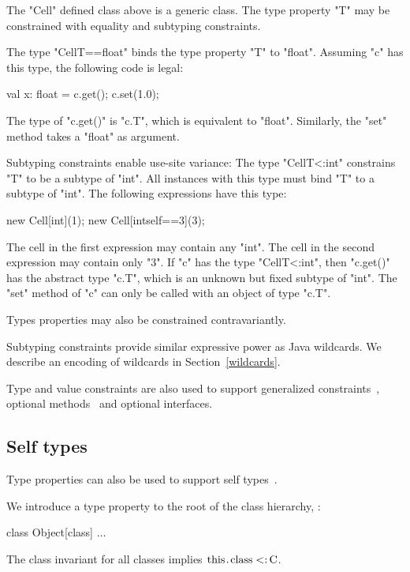 \documentclass[preprint,nocopyrightspace,9pt]{sigplanconf}
\begin{document}
The \xcd"Cell" defined class above is a generic class.
The type property \xcd"T" may be constrained with equality and
subtyping constraints.

The type \xcd"Cell{T==float}"
binds the type property \xcd"T" to \xcd"float".
Assuming \xcd"c" has this type, the following code is legal:
\begin{xten}
val x: float = c.get();
c.set(1.0);
\end{xten}
The type of \xcd"c.get()" is \xcd"c.T", which is equivalent to
\xcd"float".
Similarly, the \xcd"set" method takes a \xcd"float" as argument.

Subtyping constraints enable use-site variance:
The type \xcd"Cell{T<:int}"
constrains \xcd"T" to be a subtype of \xcd"int".
All instances with this type must bind \xcd"T" to a subtype of \xcd"int".
The following expressions have this type:
\begin{xten}
new Cell[int](1);
new Cell[int{self==3}](3);
\end{xten}
The cell in the first expression may contain any \xcd"int".
The cell in the second expression may contain only \xcd"3".
%
If \xcd"c" has the type \xcd"Cell{T<:int}",
then \xcd"c.get()" has the abstract type \xcd"c.T", which is an unknown but
fixed subtype of \xcd"int".  The \xcd"set" method of \xcd"c" can
only be called with an object of type \xcd"c.T".

Types properties may also be constrained contravariantly.

Subtyping constraints provide similar expressive power as Java
wildcards.  We describe an encoding of wildcards in
Section~\ref{wildcards}. 

Type and value constraints are also used to support generalized
constraints~\cite{emir06}, optional methods~\cite{???} and
optional interfaces.

\subsection{Self types}

Type properties can also be used to support self
types~\cite{bruce-binary,bsg95}.

We introduce a 
type property  to the root of the class hierarchy, :
\begin{xtenmath}
class Object[class] { $\dots$ }
\end{xtenmath}

The class invariant for all classes 
implies $\Xcd{this}.\Xcd{class} \subtype \Xcd{C}$.
\end{document}
